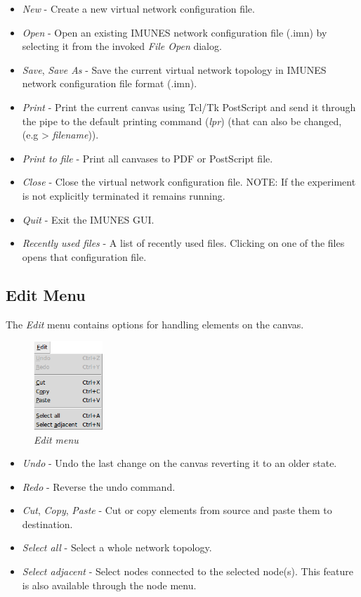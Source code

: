   \begin{itemize}
  \item \emph{New} - Create a new virtual network configuration file.
  \item \emph{Open} - Open an existing IMUNES network configuration file (.imn)
by selecting it from the invoked \emph{File Open} dialog.
  \item \emph{Save}, \emph{Save As} - Save the current virtual network topology
in IMUNES network configuration file format (.imn).
  \item \emph{Print} - Print the current canvas using Tcl/Tk PostScript and
send it through the pipe to the default printing command (\emph{lpr}) (that can
also be changed, (e.g > \emph{filename})).
  \item \emph{Print to file} - Print all canvases to PDF or PostScript file. 
  \item \emph{Close} - Close the virtual network configuration file. NOTE: If
the experiment is not explicitly terminated it remains running.
  \item \emph{Quit} - Exit the IMUNES GUI.
  \item \emph{Recently used files} - A list of recently used files. Clicking on
one of the files opens that configuration file.
  \end{itemize}
  
   \subsection{Edit Menu}
  The \emph{Edit} menu contains options for handling elements on the canvas.
  
  \begin{figure}[H]
  \centering
  \vspace{10pt}
  \includegraphics[width=0.23\textwidth]{./images/edit_menu.png}
  \caption{\emph{Edit menu}}
  \label{fig:edit_menu}
  \end{figure}
  
  \begin{itemize}
  \item \emph{Undo} - Undo the last change on the canvas reverting it to an
older state.
  \item \emph{Redo} - Reverse the undo command.
  \item \emph{Cut}, \emph{Copy}, \emph{Paste} - Cut or copy elements from
source and paste them to destination.
  \item \emph{Select all} - Select a whole network topology.
  \item \emph{Select adjacent} - Select nodes connected to the selected
node(s). This feature is also available through the node menu.
  \end{itemize}
